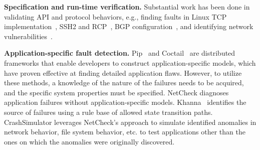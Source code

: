 
\noindent
{\bf Specification and run-time verification.}  Substantial work has
been done in validating API and protocol behaviors, e.g., finding
faults in Linux TCP implementation~\cite{Musuvathi04modelchecking},
SSH2 and RCP~\cite{Udrea:2008}, BGP
configuration~\cite{Feamster:2005}, and identifying network
vulnerabilities~\cite{ritchey-sp00}. 

\noindent
{\bf Application-specific fault detection.}
Pip~\cite{reynolds2006pip} and
Coctail~\cite{xue2012using} are distributed frameworks that enable developers to
construct application-specific models, which have proven effective at finding
detailed application flaws. However, to utilize these methods,
a knowledge of the nature of the failures needs to be acquired, and the
specific system properties must be specified. NetCheck
diagnoses application failures without application-specific models.
Khanna~\cite{khanna2007automated} identifies the source of failures using 
a rule base of allowed state transition paths.
CrashSimulator leverages NetCheck's approach to simulate identified
anomalies in network behavior, file system behavior, etc. to test
applications other than the ones on which the anomalies were originally discovered.



